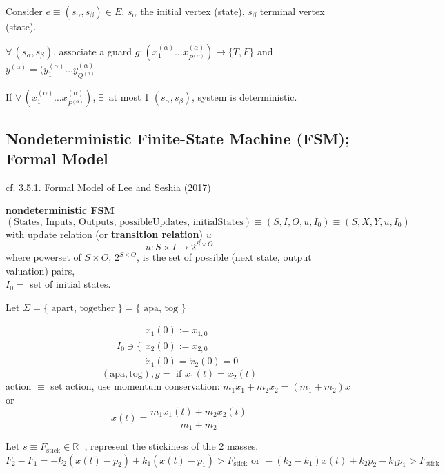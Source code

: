\documentclass[10pt]{amsart}
\begin{document}
\begin{multicols*}{2}
Consider $e\equiv (s_{\alpha},s_{\beta}) \in E$, $s_{\alpha}$ the initial vertex (state), $s_{\beta}$ terminal vertex (state).  

$\forall \, (s_{\alpha}, s_{\beta})$, associate a guard $g: (x_1^{(\alpha)} \dots x_{P^{(\alpha)}}^{(\alpha)} ) \mapsto \lbrace T,F \rbrace$ and $y^{(\alpha)} = (y_1^{(\alpha)} \dots y_{Q^{(\alpha)}}^{(\alpha)}$

If $\forall \, (x_1^{( \alpha)} \dots x_{P^{(\alpha)}}^{(\alpha)})$, $\exists \, $ at most 1 $(s_{\alpha}, s_{\beta} )$, system is deterministic.  


\subsection{Nondeterministic Finite-State Machine (FSM); Formal Model}  

cf. 3.5.1. Formal Model of Lee and Seshia (2017) \cite{LeSe2017} 

\textbf{nondeterministic FSM}  
\begin{equation}
	(\text{States, Inputs, Outputs, possibleUpdates, initialStates}) \equiv (S,I,O,u,I_0)  \equiv (S,X,Y,u,I_0)
\end{equation}
with update relation (or \textbf{transition relation}) $u$
\[
u:S\times I \to 2^{S\times O} 
\]
where powerset of $S\times O$, $2^{S\times O}$, is the set of possible (next state, output valuation) pairs, \\
$I_0 = $ set of initial states.  





Let $\Sigma = \lbrace \text{ apart, together } \rbrace = \lbrace \text{ apa, tog } \rbrace$  

\[
I_0 \ni \lbrace \begin{gathered} 
x_1(0) := x_{1,0} \\ 
x_2(0) := x_{2,0} \\
\dot{x}_1(0) = \dot{x}_2(0) = 0 \end{gathered}
\]
\[
(\text{apa},\text{tog}) , g= \text{ if } x_1(t) = x_2(t)
\]
action $\equiv$ set action, use momentum conservation: $m_1 \dot{x}_1 + m_2 \dot{x}_2 = (m_1+m_2) \dot{x} $ or 
\[
\dot{x}(t) = \frac{m_1 \dot{x}_1(t) + m_2\dot{x}_2(t) }{ m_1 + m_2 } 
\]

Let $s \equiv F_{\text{stick}} \in \mathbb{R}_+$, represent the stickiness of the 2 masses.  
\[
F_2-F_1 = -k_2 (x(t) - p_2) + k_1(x(t) - p_1) > F_{\text{stick}} \text{ or } -(k_2- k_1) x(t) + k_2 p_2 - k_1 p_1 > F_{\text{stick}}
\]



\end{multicols*}
\end{document}
